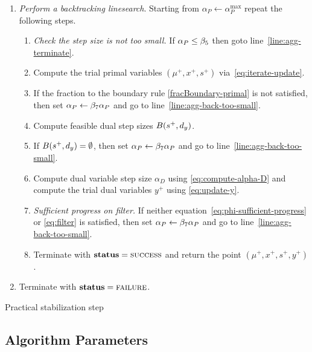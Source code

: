 \documentclass{article}
\begin{document}
\begin{algorithm}[H]
\begin{enumerate}[label*=A.{\arabic*}]
\item \label{agg:line:back-track} \emph{Perform a backtracking linesearch}. Starting from $\alpha_{P} \gets \alpha^{\max}_{P}$ repeat the following steps.
\begin{enumerate}[label*=.{\arabic*}]
\item \label{line:agg-back-too-small} \emph{Check the step size is not too small.} If $\alpha_{P} \le \beta_{5}$ then goto line~\ref{line:agg-terminate}.
\item Compute the trial primal variables $(\mu^{+}, x^{+}, s^{+})$ via~\eqref{eq:iterate-update}.
\item If the fraction to the boundary rule \eqref{fracBoundary-primal} is not satisfied, then set $\alpha_{P} \gets \beta_{7} \alpha_{P}$ and go to line~\ref{line:agg-back-too-small}. 
\item Compute feasible dual step sizes $B( s^{+}, d_{y} )$.
\item If $B( s^{+}, d_{y} ) = \emptyset$, then set $\alpha_{P} \gets \beta_{7} \alpha_{P}$ and go to line~\ref{line:agg-back-too-small}.
\item Compute dual variable step size $\alpha_{D}$ using \eqref{eq:compute-alpha-D} and compute the trial dual variables $y^{+}$ using \eqref{eq:update-y}.
\item \label{line:filter} \emph{Sufficient progress on filter.} If neither equation~\eqref{eq:phi-sufficient-progress} or \eqref{eq:filter} is satisfied, then set $\alpha_{P} \gets \beta_{7} \alpha_{P}$ and go to line~\ref{line:agg-back-too-small}.
\item Terminate with $\textbf{status} = \textsc{success}$ and return the point $(\mu^{+}, x^{+}, s^{+}, y^{+})$.
\end{enumerate}
\item \label{line:agg-terminate} Terminate with $\textbf{status} = \textsc{failure}$.
\end{enumerate}
\caption{Practical stabilization step}\label{alg:stable}
\end{algorithm}




\subsection{Algorithm Parameters}
\end{document}

